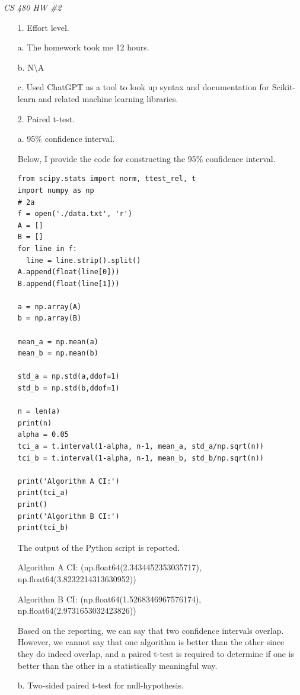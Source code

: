 \documentclass[12pt]{report}
\begin{document}
\centerline{\it CS 480 HW \#2}

\begin{enumerate}

\item[1.] Effort level.

\item[a.] The homework took me 12 hours.
\item[b.] N\textbackslash A
\item[c.] Used ChatGPT as a tool to look up syntax and documentation for
  Scikit-learn and related machine learning libraries.

\item[2.] Paired t-test.

\item[a.] 95\% confidence interval.

  Below, I provide the code for constructing the 95\% confidence interval.
\begin{verbatim}
from scipy.stats import norm, ttest_rel, t
import numpy as np
# 2a
f = open('./data.txt', 'r')
A = []
B = []
for line in f:
  line = line.strip().split()
A.append(float(line[0]))
B.append(float(line[1]))

a = np.array(A)
b = np.array(B)

mean_a = np.mean(a)
mean_b = np.mean(b)

std_a = np.std(a,ddof=1)
std_b = np.std(b,ddof=1)

n = len(a)
print(n)
alpha = 0.05
tci_a = t.interval(1-alpha, n-1, mean_a, std_a/np.sqrt(n))
tci_b = t.interval(1-alpha, n-1, mean_b, std_b/np.sqrt(n))

print('Algorithm A CI:')
print(tci_a)
print()
print('Algorithm B CI:')
print(tci_b)
\end{verbatim}

The output of the Python script is reported.

Algorithm A CI:
(np.float64(2.3434452353035717), np.float64(3.8232214313630952))

Algorithm B CI:
(np.float64(1.5268346967576174), np.float64(2.9731653032423826))

Based on the reporting, we can say that two confidence intervals overlap.
However, we cannot say that one algorithm is better than the other since they do
indeed overlap, and a paired t-test is required to determine if one is better
than the other in a statistically meaningful way.
\item[b.] Two-sided paired t-test for null-hypothesis.


\end{enumerate}
\end{document}
